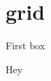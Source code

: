 \documentclass[../main.tex]{subfiles}
\begin{document}
\section{grid}


\begin{cbox}
	First box
\end{cbox} 


\begin{ebox}
			Hey
		\end{ebox}
\end{document}
